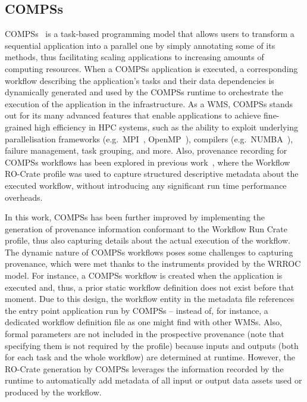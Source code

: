 \subsection{COMPSs}\label{wrroc:compss}

COMPSs~\cite{Lordan 2014} is a task-based programming model that allows users to transform a sequential application into a parallel one by simply annotating some of its methods, thus facilitating scaling applications to increasing amounts of computing resources.
When a COMPSs application is executed, a corresponding workflow describing the application's tasks and their data dependencies is dynamically generated and used by the COMPSs runtime to orchestrate the execution of the application in the infrastructure.
As a WMS, COMPSs stands out for its many advanced features that enable applications to achieve fine-grained high efficiency in HPC systems, such as the ability to exploit underlying parallelisation frameworks (e.g.~MPI~\cite{Gabriel 2004}, OpenMP~\cite{Dagum 1998}), compilers (e.g.~NUMBA~\cite{Lam 2015}), failure management, task grouping, and more.  Also, provenance recording for COMPSs workflows has been explored in previous work~\cite{Sirvent 2022}, where the Workflow RO-Crate profile was used to capture structured descriptive metadata about the executed workflow, without introducing any significant run time performance overheads.

In this work, COMPSs has been further improved by implementing the generation of provenance
information conformant to the Workflow Run Crate profile, thus also capturing
details about the actual execution of the workflow.
%
The dynamic nature of COMPSs workflows poses some challenges to capturing
provenance, which were met thanks to the instruments
provided by the WRROC model.
%
For instance, a COMPSs workflow is created when the application is executed and, thus, a prior static workflow definition does not exist before that moment.
Due to this design, the workflow entity in the metadata file references the entry point application run by COMPSs -- instead of, for instance, a dedicated workflow definition file as one might find with other WMSs. Also, formal parameters are not included in the prospective provenance (note that specifying them is not required by the profile) because inputs and outputs (both for each task and the whole workflow) are determined at runtime.
However, the RO-Crate generation by COMPSs leverages the information recorded by the runtime to automatically add metadata of all input or output data assets used or produced by the workflow.

